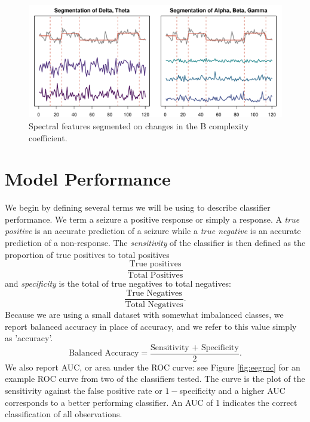 \begin{figure}[!htbp]
  \begin{center}
  \includegraphics[width = \textwidth, keepaspectratio]{./figs/eeg-segment-plot.pdf}
  \end{center}
  \label{fig:segplot} 
  \caption{Spectral features segmented on changes in the B complexity coefficient.}
\end{figure}

\section{Model Performance}

We begin by defining several terms we will be using to describe classifier performance. We term a seizure a 
positive response or simply a response. A  
\textit{true positive}  
is an accurate prediction of a seizure while a 
 \textit{true negative} is an accurate prediction of a non-response. 
The  \textit{sensitivity} of the classifier is then 
defined as the proportion of true positives to total 
positives
\[
  \frac{\text{True positives}}{\text{Total Positives}}
\]
 and  \textit{specificity} is the total of true 
negatives to total negatives:
\[
  \frac{\text{True Negatives}}{\text{Total Negatives}}.
\] 
Because we are using a small dataset with somewhat imbalanced classes, we report balanced accuracy in place of accuracy, and we refer to this value simply as 'accuracy'.
\[
  \text{Balanced Accuracy} = \frac{\text{Sensitivity + Specificity}}{2}.
\] 
We also report AUC, or area under the ROC curve: see 
Figure \ref{fig:eegroc} for an example ROC curve from two 
of the classifiers tested. The curve is the plot 
of the sensitivity against the false positive rate or 
$1 - $specificity and a higher AUC corresponds to a better performing classifier. An AUC of 1 indicates the correct classification of 
all observations.

